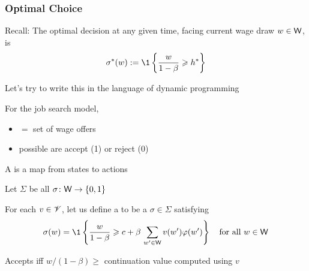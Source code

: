 \begin{frame}
    \frametitle{Optimal Choice}
    
    Recall: The optimal decision at any given time, facing current wage draw $w \in
    \mathsf W$, is 
    \begin{equation*}
        \sigma^*(w) := \1 \left\{ \frac{w}{1-\beta} \geq h^* \right\}
    \end{equation*}

    \vspace{1em}

    Let's try to write this in the language of dynamic programming
    

\end{frame}



\begin{frame}
    
    For the job search model, 
    \begin{itemize}
        \item {} $=$ set of wage offers 
        \item possible  are accept (1) or reject (0)
    \end{itemize}

    A  is a map from states to actions

    Let $\Sigma$ be all $\sigma \colon \mathsf W \to \{0, 1\}$

    For each $v \in \mathscr V$, let us define a  to be a $\sigma \in \Sigma$ satisfying
    \begin{equation*}
        \sigma(w) 
        = \1
        \left\{
            \frac{w}{1-\beta}
            \geq
            c + \beta \, \sum_{w' \in \Wsf} v(w') \phi(w')
        \right\}
        \quad \text{for all } w \in \Wsf
    \end{equation*}

    Accepts iff $w/(1-\beta) \geq$ continuation value computed
    using $v$ 

\end{frame}


